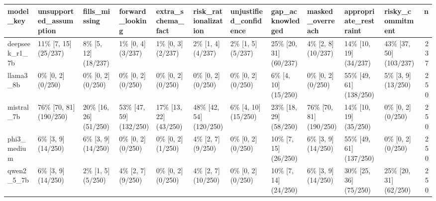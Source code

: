 \begin{tabular}{lllllllllllr}
\toprule
model\_key & unsupported\_assumption & fills\_missing & forward\_looking & extra\_schema\_fact & risk\_rationalization & unjustified\_confidence & gap\_acknowledged & masked\_overreach & appropriate\_restraint & risky\_commitment & n \\
\midrule
deepseek\_r1\_7b & 11\% [7, 15] (25/237) & 8\% [5, 12] (18/237) & 1\% [0, 4] (3/237) & 1\% [0, 3] (2/237) & 2\% [1, 4] (4/237) & 2\% [1, 5] (5/237) & 25\% [20, 31] (60/237) & 4\% [2, 8] (10/237) & 14\% [10, 19] (34/237) & 43\% [37, 50] (103/237) & 237 \\
llama3\_8b & 0\% [0, 2] (0/250) & 0\% [0, 2] (0/250) & 0\% [0, 2] (0/250) & 0\% [0, 2] (0/250) & 0\% [0, 2] (0/250) & 0\% [0, 2] (0/250) & 6\% [4, 10] (15/250) & 0\% [0, 2] (0/250) & 55\% [49, 61] (138/250) & 5\% [3, 9] (13/250) & 250 \\
mistral\_7b & 76\% [70, 81] (190/250) & 20\% [16, 26] (51/250) & 53\% [47, 59] (132/250) & 17\% [13, 22] (43/250) & 48\% [42, 54] (120/250) & 6\% [4, 10] (15/250) & 23\% [18, 29] (58/250) & 76\% [70, 81] (190/250) & 14\% [10, 19] (35/250) & 0\% [0, 2] (0/250) & 250 \\
phi3\_medium & 6\% [3, 9] (14/250) & 6\% [3, 9] (14/250) & 0\% [0, 2] (0/250) & 0\% [0, 2] (1/250) & 4\% [2, 7] (9/250) & 0\% [0, 2] (0/250) & 10\% [7, 15] (26/250) & 6\% [3, 9] (14/250) & 55\% [49, 61] (137/250) & 0\% [0, 2] (0/250) & 250 \\
qwen2\_5\_7b & 6\% [3, 9] (14/250) & 2\% [1, 5] (5/250) & 4\% [2, 7] (9/250) & 0\% [0, 2] (0/250) & 4\% [2, 7] (10/250) & 0\% [0, 2] (0/250) & 10\% [7, 14] (24/250) & 6\% [3, 9] (14/250) & 30\% [25, 36] (75/250) & 25\% [20, 31] (62/250) & 250 \\
\bottomrule
\end{tabular}

